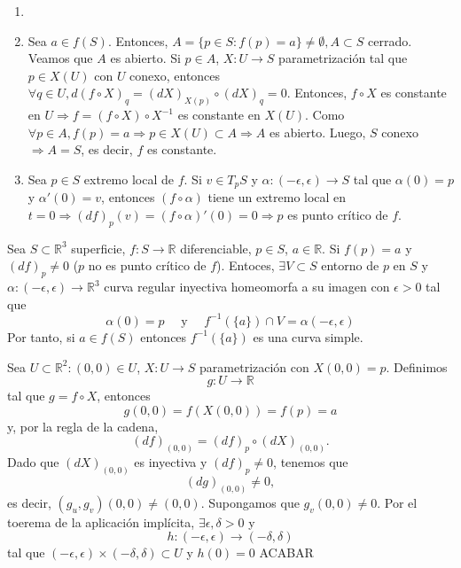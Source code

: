 \begin{dem}
  \begin{enumerate}[label=(\roman*)]
    \item []
    \item Sea $a \in f(S)$. Entonces, $A = \{ p \in S : f(p) = a \} \neq \emptyset, A \subset S$ cerrado. Veamos que $A$ es abierto. Si $p \in A$, $X : U \to S$ parametrización tal que $p \in X(U)$ con $U$ conexo, entonces $\forall q \in U, d(f \circ X)_{q} = (d X)_{X(p)} \circ (d X)_{q} = 0$. Entonces, $f \circ X$ es constante en $U \Rightarrow f = (f \circ X) \circ X^{-1}$ es constante en $X(U)$. Como $\forall p \in A, f(p) = a \Rightarrow p \in X(U) \subset A \Rightarrow A$ es abierto. Luego, $S$ conexo $\Rightarrow A = S$, es decir, $f$ es constante.
    \item Sea $p \in S$ extremo local de $f$. Si $v \in T_{p}S$ y $\alpha : (-\epsilon, \epsilon) \to S$ tal que $\alpha(0) = p$ y $\alpha'(0) = v$, entonces $(f \circ \alpha)$ tiene un extremo local en $t =0 \Rightarrow (d f)_{p}(v) = (f \circ \alpha)'(0) = 0 \Rightarrow p$ es punto crítico de $f$.
  \end{enumerate}
\end{dem}

\begin{theo}
  Sea $S \subset \mathbb{R}^{3}$ superficie, $f : S \to \mathbb{R}$ diferenciable, $p \in S$, $a \in \mathbb{R}$. Si $f(p) = a$ y $(d f)_{p} \neq 0$ ($p$ no es punto crítico de $f$). Entoces, $\exists V \subset S$ entorno de $p$ en $S$ y $ \alpha : (-\epsilon, \epsilon) \to \mathbb{R}^{3}$ curva regular inyectiva homeomorfa a su imagen con $\epsilon >0 $ tal que
  \[
    \alpha(0) = p \quad \text{ y } \quad f^{-1}(\{ a \}) \cap V = \alpha(-\epsilon,\epsilon)
  \]
  Por tanto, si $a \in f(S)$ entonces $f^{-1}(\{ a \})$ es una curva simple.
\end{theo}

\begin{dem}
  Sea $U \subset \mathbb{R}^{2} : (0, 0) \in U$, $X : U \to S$ parametrización con $X(0, 0) = p$. Definimos
  \[
    g : U \to \mathbb{R}
  \]
  tal que $g = f \circ X$, entonces
  \[
    g(0,0) = f(X(0,0)) = f(p) = a
  \]
  y, por la regla de la cadena,
  \[
    (d f)_{(0, 0)} = (d f)_{p} \circ (d X)_{(0,0)}.
  \]
  Dado que $(d X)_{(0,0)}$ es inyectiva y $(d f)_{p} \neq 0$, tenemos que
  \[
    (d g)_{(0, 0)} \neq 0,
  \]
  es decir, $(g_{u}, g_{v})(0, 0) \neq (0, 0)$. Supongamos que $g_{v}(0, 0) \neq 0$. Por el toerema de la aplicación implícita, $\exists \epsilon, \delta >0$ y
  \[ 
    h : (-\epsilon, \epsilon) \to (-\delta, \delta) 
  \] 
  tal que $(-\epsilon, \epsilon) \times (-\delta, \delta) \subset U$ y $h(0) = 0$
  ACABAR
\end{dem}

